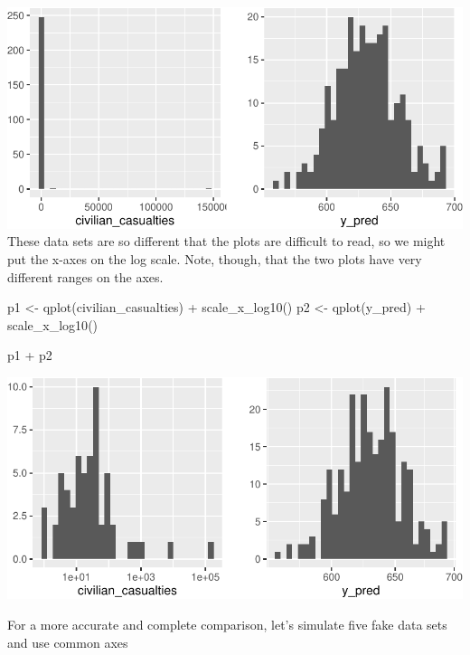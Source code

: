 \documentclass[
]{book}
\newenvironment{Shaded}{\begin{snugshade}}{\end{snugshade}}
\newcommand{\FunctionTok}[1]{\textcolor[rgb]{0.00,0.00,0.00}{#1}}
\newcommand{\NormalTok}[1]{#1}
\newcommand{\OtherTok}[1]{\textcolor[rgb]{0.56,0.35,0.01}{#1}}
\newcommand{\SpecialCharTok}[1]{\textcolor[rgb]{0.00,0.00,0.00}{#1}}
\begin{document}
\includegraphics{01-05-predictive-distribution_files/figure-latex/unnamed-chunk-4-1.pdf}
These data sets are so different that the plots are difficult to read,
so we might put the x-axes on the log scale. Note, though, that the two
plots have very different ranges on the axes.

\begin{Shaded}
\begin{Highlighting}[]
\NormalTok{p1 }\OtherTok{\textless{}{-}} \FunctionTok{qplot}\NormalTok{(civilian\_casualties) }\SpecialCharTok{+} \FunctionTok{scale\_x\_log10}\NormalTok{()}
\NormalTok{p2 }\OtherTok{\textless{}{-}} \FunctionTok{qplot}\NormalTok{(y\_pred) }\SpecialCharTok{+} \FunctionTok{scale\_x\_log10}\NormalTok{()}

\NormalTok{p1 }\SpecialCharTok{+}\NormalTok{ p2}
\end{Highlighting}
\end{Shaded}

\includegraphics{01-05-predictive-distribution_files/figure-latex/unnamed-chunk-5-1.pdf}

For a more accurate and complete comparison, let's simulate five fake
data sets and use common axes
\end{document}
